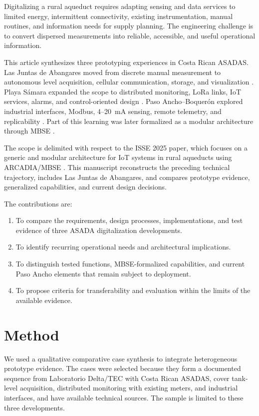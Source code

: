 \documentclass[conference]{IEEEtran}
\begin{document}
Digitalizing a rural aqueduct requires adapting sensing and data services to limited energy, intermittent connectivity, existing instrumentation, manual routines, and information needs for supply planning. The engineering challenge is to convert dispersed measurements into reliable, accessible, and useful operational information.

This article synthesizes three prototyping experiences in Costa Rican ASADAS. Las Juntas de Abangares moved from discrete manual measurement to autonomous level acquisition, cellular communication, storage, and visualization \cite{chavarria2021implementacion}. Playa Sámara expanded the scope to distributed monitoring, LoRa links, IoT services, alarms, and control-oriented design \cite{solorzano2021sistema}. Paso Ancho--Boquerón explored industrial interfaces, Modbus, 4--20~mA sensing, remote telemetry, and replicability \cite{oviedo2024desarrollo}. Part of this learning was later formalized as a modular architecture through MBSE \cite{arguedas2025towards}.

The scope is delimited with respect to the ISSE 2025 paper, which focuses on a generic and modular architecture for IoT systems in rural aqueducts using ARCADIA/MBSE \cite{arguedas2025towards}. This manuscript reconstructs the preceding technical trajectory, includes Las Juntas de Abangares, and compares prototype evidence, generalized capabilities, and current design decisions.

The contributions are:
\begin{enumerate}
\item To compare the requirements, design processes, implementations, and test evidence of three ASADA digitalization developments.
\item To identify recurring operational needs and architectural implications.
\item To distinguish tested functions, MBSE-formalized capabilities, and current Paso Ancho elements that remain subject to deployment.
\item To propose criteria for transferability and evaluation within the limits of the available evidence.
\end{enumerate}

\section{Method}
We used a qualitative comparative case synthesis to integrate heterogeneous prototype evidence. The cases were selected because they form a documented sequence from Laboratorio Delta/TEC with Costa Rican ASADAS, cover tank-level acquisition, distributed monitoring with existing meters, and industrial interfaces, and have available technical sources. The sample is limited to these three developments.
\end{document}
